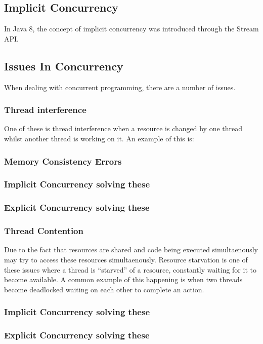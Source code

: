 \documentclass[]{report}
\begin{document}
\subsection{Implicit Concurrency}

In Java 8, the concept of implicit concurrency was introduced through the Stream API. 

\subsection{Issues In Concurrency}
When dealing with concurrent programming, there are a number of issues. 

\subsubsection{Thread interference}
One of these is thread interference when a resource is changed by one thread whilst another thread is working on it. An example of this is:
\subsubsection{Memory Consistency Errors}
\subsubsection{Implicit Concurrency solving these}
\subsubsection{Explicit Concurrency solving these}
\subsubsection{Thread Contention}
Due to the fact that resources are shared and code being executed simultaenously may try to access these resources simultaenously. Resource starvation is one of these issues where a thread is “starved” of a resource, constantly waiting for it to become available. A common example of this happening is when two threads become deadlocked waiting on each other to complete an action.
\subsubsection{Implicit Concurrency solving these}
\subsubsection{Explicit Concurrency solving these}
\end{document}
